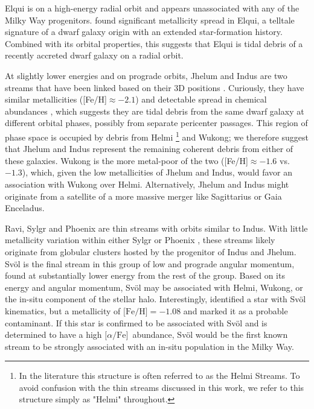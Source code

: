 \documentclass[twocolumn]{aastex63}
\newcommand{\feh}{\ensuremath{\textrm{[Fe/H]}}}
\newcommand{\afe}{\ensuremath{\textrm{[$\alpha$/Fe]}}}
\begin{document}
Elqui is on a high-energy radial orbit and appears unassociated with any of the Milky Way progenitors.
\citet{ji2020} found significant metallicity spread in Elqui, a telltale signature of a dwarf galaxy origin with an extended star-formation history.
Combined with its orbital properties, this suggests that Elqui is tidal debris of a recently accreted dwarf galaxy on a radial orbit.


At slightly lower energies and on prograde orbits, Jhelum and Indus are two streams that have been linked based on their 3D positions \citep{bonaca2019b}.
Curiously, they have similar metallicities ([Fe/H]$\approx-2.1$) and detectable spread in chemical abundances \citep{ji2020}, which suggests they are tidal debris from the same dwarf galaxy at different orbital phases, possibly from separate pericenter passages.
This region of phase space is occupied by debris from Helmi \footnote{In the literature this structure is often referred to as the Helmi Streams.  To avoid confusion with the thin streams discussed in this work, we refer to this structure simply as "Helmi" throughout.} and Wukong; we therefore suggest that Jhelum and Indus represent the remaining coherent debris from either of these galaxies.
Wukong is the more metal-poor of the two ([Fe/H]$\approx-1.6$ vs. $-1.3$), which, given the low metallicities of Jhelum and Indus, would favor an association with Wukong over Helmi.
Alternatively, Jhelum and Indus might originate from a satellite of a more massive merger like Sagittarius or Gaia Enceladus.

Ravi, Sylgr and Phoenix are thin streams with orbits similar to Indus.
With little metallicity variation within either Sylgr or Phoenix \citep{ibata2019, wan2020}, these streams likely originate from globular clusters hosted by the progenitor of Indus and Jhelum.
Sv\" ol is the final stream in this group of low and prograde angular momentum, found at substantially lower energy from the rest of the group.
Based on its energy and angular momentum, Sv\" ol may be associated with Helmi, Wukong, or the in-situ component of the stellar halo.
Interestingly, \citet{ibata2019} identified a star with Sv\" ol kinematics, but a metallicity of $\feh=-1.08$ and marked it as a probable contaminant.
If this star is confirmed to be associated with Sv\" ol and is determined to have a high \afe\ abundance, Sv\" ol would be the first known stream to be strongly associated with an in-situ population in the Milky Way.
\end{document}

